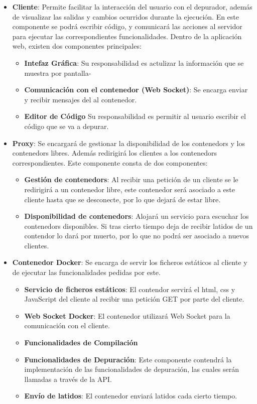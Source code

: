 \begin{itemize}
    \item \textbf{Cliente}: Permite facilitar la interacción del usuario con el depurador, además de visualizar las salidas y cambios ocurridos durante la ejecución. En este componente se podrá escribir código, y comunicará las acciones al servidor para ejecutar las correspondientes funcionalidades. 
    Dentro de la aplicación web, existen dos componentes principales:

    \begin{itemize}
        \item \textbf{Intefaz Gráfica}: Su responsabilidad es actulizar la información que se muestra por pantalla-
        \item \textbf{Comunicación con el contenedor (Web Socket)}: Se encarga enviar y recibir mensajes del al contenedor.
        \item \textbf{Editor de Código} Su responsabilidad es permitir al usuario escribir el código que se va a depurar.
    \end{itemize}

    \item \textbf{Proxy}: Se encargará de gestionar la disponibilidad de los \glspl{contenedor} y los \glspl{contenedor} libres. Además redirigirá los clientes a los \glspl{contenedor} correspondientes.
    Este componente consta de dos componentes:
    \begin{itemize}
        \item \textbf{Gestión de \glspl{contenedor}}: Al recibir una petición de un cliente se le redirigirá a un contenedor libre, este contenedor será asociado a este cliente hasta que se desconecte, por lo que dejará de estar libre.
        \item \textbf{Disponibilidad de \glspl{contenedor}}: Alojará un servicio para escuchar los \glspl{contenedor} disponibles. Si tras cierto tiempo deja de recibir latidos de un contendor lo dará por muerto, por lo que no podrá ser asociado a nuevos clientes.  
    \end{itemize}

    \item \textbf{Contenedor Docker}: Se encarga de servir los ficheros estáticos al cliente y de ejecutar las funcionalidades pedidas por este.
    \begin{itemize}
        \item \textbf{Servicio de ficheros estáticos}: El contendor servirá el html, css y JavaScript del cliente al recibir una petición GET por parte del cliente.
        \item \textbf{Web Socket Docker}: El contenedor utilizará Web Socket para la comunicación con el cliente.
        \item \textbf{Funcionalidades de Compilación}
        \item \textbf{Funcionalidades de Depuración}: Este componente contendrá la implementación de las funcionalidades de depuración, las cuales serán llamadas a través de la API.
        \item \textbf{Envío de latidos}: El contenedor enviará latidos cada cierto tiempo.
    \end{itemize}
\end{itemize}

